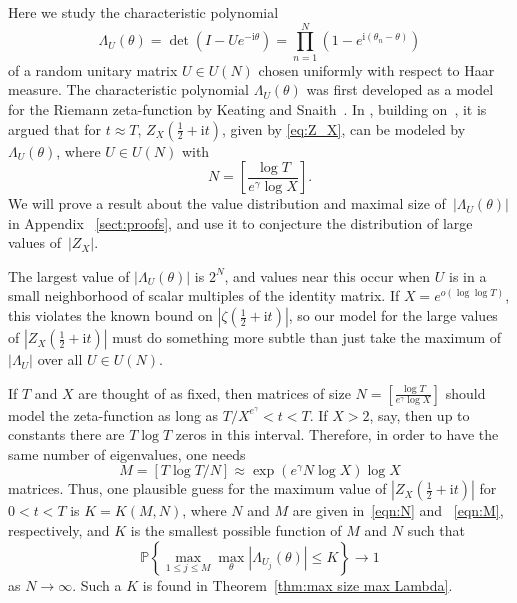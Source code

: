 \documentclass[10pt,reqno,twoside]{amsart}
\renewcommand{\i}{{\mathrm{i}}} %
\newcommand{\Prob}{\mathbb{P}}
\numberwithin{equation}{section}
\numberwithin{theorem}{section}
\begin{document}
{{Here we study the characteristic polynomial
\begin{equation}
\Lambda_U(\theta) = \det\left(I-U e^{-\i\theta}\right) =
\prod_{n=1}^N \left(1-e^{\i(\theta_n-\theta)}\right)
\end{equation}
of a random unitary matrix $U\in U(N)$  chosen uniformly with respect to Haar
measure. The characteristic polynomial $\Lambda_U(\theta)$ was
first developed as a model for the Riemann zeta-function by
Keating and Snaith~\cite{KeaSna}. In \cite{GHK}, building
on~\cite{KeaSna}, it is argued that for $t \approx T$, $Z_X(\frac12+\i t)$, given by
\eqref{eq:Z_X}, can be modeled by $\Lambda_U(\theta)$, where $U\in
U(N)$ with
\begin{equation}\label{eqn:N}
N = \left[ \frac{\log T }{ e^\gamma \log X} \right].
\end{equation}
We will prove a result about the value distribution and maximal
size of~$|\Lambda_U(\theta)|$ in Appendix ~\ref{sect:proofs}, and use
it to conjecture the distribution of large values of~$|Z_X|$.

The largest value of $|\Lambda_U(\theta)|$  is $2^N$, and values near
this  occur  when $U$ is in a small neighborhood of scalar multiples of
the identity matrix.
If $X = e^{o(\log\log T)}$, this violates the known bound  on
$|\zeta(\frac12+\i t)|$, so our model for the large values of
$|Z_X(\frac12+\i t)|$ must do something more subtle than just take
the maximum of $|\Lambda_U|$ over all $U\in U(N)$.

If $T$ and $X$ are
thought of as fixed, then matrices of size
$N = [\frac{\log T}{e^\gamma \log X}]$
should model the zeta-function as long as
$T /X^{e^\gamma}  < t <T$.
If $X>2$, say, then up to constants there are $T\log T$
zeros in this interval. Therefore, in order to
have the same number of eigenvalues, one needs
\begin{equation}\label{eqn:M}
M=[T \log T / N] \approx \exp\left({e^\gamma N \log X}\right) \log X
\end{equation}
matrices. Thus, one
plausible guess for the maximum value of $|Z_X(\frac12+\i t)|$ for
$0<t<T$  is $K = K(M,N)$, where $N$ and $M$ are given
in~\eqref{eqn:N} and ~\eqref{eqn:M}, respectively, and $K$ is
the smallest  possible function of $M$ and $N$ such that
\begin{equation}\label{tail prob}
\Prob\left\{ \max_{1\leq j \leq M}
\max_{\theta}|\Lambda_{U_j}(\theta)| \leq K \right\} \to 1
\end{equation}
as $N\to\infty$. Such a $K$ is found in
Theorem~\ref{thm:max size max Lambda}.

}}
\end{document}
